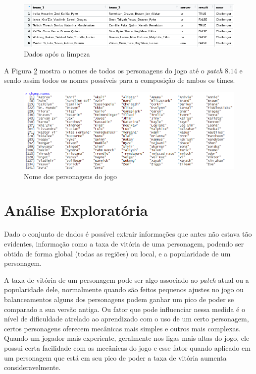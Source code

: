 \documentclass[a4paper]{article}
\begin{document}
\begin{figure}[ht]
\centering
\includegraphics[width=15cm]{imagens/clean_data2}
\caption{\label{fig:data_clean}Dados após a limpeza}
\end{figure}

A Figura \ref{fig:names} mostra o nomes de todos os personagens do jogo até o \textit{patch} $8.14$ e sendo assim todos os nomes possíveis para a composição de ambos os times. 


\begin{figure}
\centering
\includegraphics[width=15cm]{imagens/champ_names}
\caption{\label{fig:names}Nome dos personagens do jogo}
\end{figure}

\section{Análise Exploratória}


Dado o conjunto de dados é possível extrair informações que antes não estava tão evidentes, informação como a taxa de vitória de uma personagem, podendo ser obtida de forma global (todas as regiões) ou local, e a popularidade de um personagem.

A taxa de vitória de um personagem pode ser algo associado ao \textit{patch} atual ou a popularidade dele, normalmente quando são feitos pequenos ajustes no jogo ou balanceamentos alguns dos personagens podem ganhar um pico de poder se comparado a sua versão antiga. Ou fator que pode influenciar nessa medida é o nível de dificuldade atrelado ao aprendizado com o uso de um certo personagem, certos personagens oferecem mecânicas mais simples e outros mais complexas. Quando um jogador mais experiente, geralmente nos ligas mais altas do jogo, ele possui certa facilidade com as mecânicas do jogo e esse fator quando aplicado em um personagem que está em seu pico de poder a taxa de vitória aumenta consideravelmente. 
\end{document}
